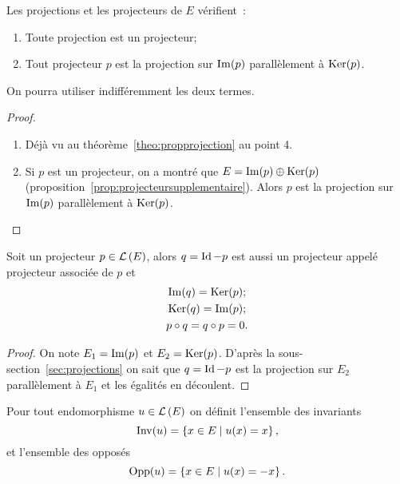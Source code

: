 \begin{prop}
  Les projections et les projecteurs de \(E\) vérifient~:
  \begin{enumerate}
    \item Toute projection est un projecteur;
    \item Tout projecteur \(p\) est la projection sur \(\operatorname{Im}(p)\)
      parallèlement à \(\operatorname{Ker}(p)\).
  \end{enumerate}
  On pourra utiliser indifféremment les deux termes.
\end{prop}
\begin{proof}
  \begin{enumerate}
    \item Déjà vu au théorème~\ref{theo:propprojection} au point 4.
    \item Si \(p\) est un projecteur, on a montré que \(E = \operatorname{Im}(p) \oplus
      \operatorname{Ker}(p)\) (proposition~\ref{prop:projecteursupplementaire}). Alors \(p\) est la projection sur
      \(\operatorname{Im}(p)\) parallèlement à \(\operatorname{Ker}(p)\).
  \end{enumerate}
\end{proof}

\begin{prop}
  Soit un projecteur \(p \in \mathcal{L}\left(E\right)\), alors \(q=\operatorname{Id}-p\) est aussi un
  projecteur appelé projecteur associée de \(p\) et
  \begin{gather}
    \operatorname{Im}(q) = \operatorname{Ker}(p);\\
    \operatorname{Ker}(q)=\operatorname{Im}(p);\\
    p \circ q = q \circ p =0.
  \end{gather}
\end{prop}
\begin{proof}
  On note \(E_1 = \operatorname{Im}(p)\) et \(E_2 = \operatorname{Ker}(p)\). D'après la sous-section~\ref{sec:projections} on sait que \(q=\operatorname{Id}-p\) est la projection sur \(E_2\)
  parallèlement à \(E_1\) et les égalités en découlent.
\end{proof}

\begin{defdef}
  Pour tout endomorphisme \(u \in \mathcal{L}\left(E\right)\) on définit l'ensemble des
  invariants
  \begin{equation}
    \operatorname{Inv}(u)=\left\{x \in E\mathrel{}\middle|\mathrel{}u(x)=x\right\},
  \end{equation}
  et l'ensemble des opposés
  \begin{equation}
    \operatorname{Opp}(u)=\left\{x \in E\mathrel{}\middle|\mathrel{}u(x)=-x\right\}.
  \end{equation}
\end{defdef}


